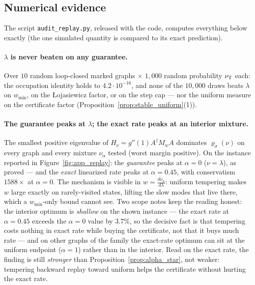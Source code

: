 \subsection{Numerical evidence}\label{sec:num_replay}

The script \texttt{audit\_replay.py}, released with the code, computes everything below
exactly (the one simulated quantity is compared to its exact prediction).

\paragraph{$\lambda$ is never beaten on any guarantee.}
Over $10$ random loop-closed marked graphs $\times$ $1{,}000$ random probability
$\nu_{\mathrm{T}}$ each: the occupation identity holds to $4.2\cdot10^{-16}$, and none of the
$10{,}000$ draws beats $\lambda$ on $w_{\min}$, on the \L ojasiewicz factor, or on the
step cap --- nor the uniform measure on the certificate factor
(Proposition~\ref{prop:stable_uniform}(1)).

\paragraph{The guarantee peaks at $\lambda$; the exact rate peaks at an interior
mixture.}
The smallest positive eigenvalue of $H_\nu=g''(1)A^\dagger M_wA$ dominates
$\varrho_\sigma(\nu)$ on every graph and every mixture $\nu_\alpha$ tested (worst margin
positive). On the instance reported in Figure~\ref{fig:app_replay}: the \emph{guarantee}
peaks at $\alpha=0$ ($\nu=\lambda$), as proved --- and the \emph{exact} linearized rate
peaks at $\alpha=0.45$, with conservatism $1588\times$ at $\alpha=0$. The mechanism is
visible in $w=\frac{d\nu_\alpha}{d\lambda}$: uniform tempering makes $w$ large exactly on
rarely-visited states, lifting the slow modes that live there, which a $w_{\min}$-only
bound cannot see. Two scope notes keep the reading honest: the interior optimum is
\emph{shallow} on the shown instance --- the exact rate at $\alpha=0.45$ exceeds the
$\alpha=0$ value by $3.7\%$, so the decisive fact is that tempering costs nothing in
exact rate while buying the certificate, not that it buys much rate --- and on other
graphs of the family the exact-rate optimum can sit at the uniform endpoint
($\alpha=1$) rather than in the interior. Read on the exact rate, the finding is still
\emph{stronger} than Proposition~\ref{prop:alpha_star}, not weaker: tempering backward
replay toward uniform helps the certificate without hurting the exact rate.

